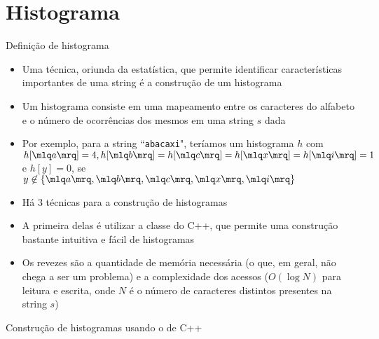 \section{Histograma}

\begin{frame}[fragile]{Definição de histograma}

    \begin{itemize}
        \item Uma técnica, oriunda da estatística, que permite identificar características 
        importantes de uma string é a construção de um histograma

        \item Um histograma consiste em uma mapeamento entre os caracteres do alfabeto e o número 
            de ocorrências dos mesmos em uma string $s$ dada

        \item Por exemplo, para a string ``\texttt{abacaxi}", teríamos um histograma $h$ com
        $h[\mlq a\mrq] = 4, h[\mlq b\mrq] = h[\mlq c\mrq] = h[\mlq x\mrq] = h[\mlq i\mrq] = 1$ e $h[y] = 0$, se $y \not \in \lbrace\mlq a\mrq, \mlq b\mrq, \mlq c\mrq, \mlq x\mrq, \mlq i\mrq\rbrace$

        \item Há 3 técnicas para a construção de histogramas

        \item A primeira delas é utilizar a classe  do C++, que permite uma 
            construção bastante intuitiva e fácil de histogramas

        \item Os revezes são a quantidade de memória necessária (o que, em geral, não chega a ser 
            um problema) e a complexidade dos acessos ($O(\log N)$ para leitura e escrita, onde
            $N$ é o número de caracteres distintos presentes na string $s$)
    \end{itemize}

\end{frame}

\begin{frame}[fragile]{Construção de histogramas usando o  de C++} 
\end{frame}

